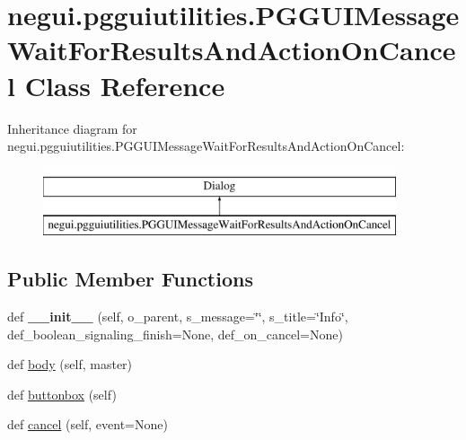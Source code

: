 \hypertarget{classnegui_1_1pgguiutilities_1_1PGGUIMessageWaitForResultsAndActionOnCancel}{}\section{negui.\+pgguiutilities.\+P\+G\+G\+U\+I\+Message\+Wait\+For\+Results\+And\+Action\+On\+Cancel Class Reference}
\label{classnegui_1_1pgguiutilities_1_1PGGUIMessageWaitForResultsAndActionOnCancel}
Inheritance diagram for negui.\+pgguiutilities.\+P\+G\+G\+U\+I\+Message\+Wait\+For\+Results\+And\+Action\+On\+Cancel\+:\begin{figure}[H]
\begin{center}
\leavevmode
\includegraphics[height=2.000000cm]{classnegui_1_1pgguiutilities_1_1PGGUIMessageWaitForResultsAndActionOnCancel}
\end{center}
\end{figure}
\subsection*{Public Member Functions}
\begin{DoxyCompactItemize}
\item 
def {\bfseries \+\_\+\+\_\+init\+\_\+\+\_\+} (self, o\+\_\+parent, s\+\_\+message=\char`\"{}\char`\"{}, s\+\_\+title=\char`\"{}Info\char`\"{}, def\+\_\+boolean\+\_\+signaling\+\_\+finish=None, def\+\_\+on\+\_\+cancel=None)\hypertarget{classnegui_1_1pgguiutilities_1_1PGGUIMessageWaitForResultsAndActionOnCancel_a86c06b014ee30c9c3dbb98524164490d}{}\label{classnegui_1_1pgguiutilities_1_1PGGUIMessageWaitForResultsAndActionOnCancel_a86c06b014ee30c9c3dbb98524164490d}

\item 
def \hyperlink{classnegui_1_1pgguiutilities_1_1PGGUIMessageWaitForResultsAndActionOnCancel_acf3395bb800e7057dde068e6141e8d99}{body} (self, master)
\item 
def \hyperlink{classnegui_1_1pgguiutilities_1_1PGGUIMessageWaitForResultsAndActionOnCancel_af083b40a524b52dd760b6f70ab5a6b25}{buttonbox} (self)
\item 
def \hyperlink{classnegui_1_1pgguiutilities_1_1PGGUIMessageWaitForResultsAndActionOnCancel_a70645e4aec555b0e813ff42dae5c1788}{cancel} (self, event=None)
\end{DoxyCompactItemize}
